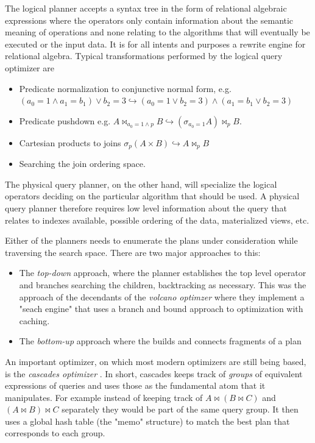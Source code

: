 The logical planner accepts a syntax tree in the form of relational
algebraic expressions where the operators only contain information
about the semantic meaning of operations and none relating to the
algorithms that will eventually be executed or the input data. It is
for all intents and purposes a rewrite engine for relational
algebra. Typical transformations performed by the logical query
optimizer are

\begin{itemize}
\item Predicate normalization to conjunctive normal form, e.g. \((a_0 = 1
  \land a_1 = b_1) \lor b_2 = 3 \hookrightarrow (a_0 = 1 \lor b_2 = 3)
  \land (a_1 = b_1 \lor b_2 = 3)\)
\item Predicate pushdown e.g. \(A \Join_{a_0 = 1 \land p} B
  \hookrightarrow (\sigma_{a_0 = 1} A) \Join_p B\).
\item Cartesian products to joins \(\sigma_p ( A \times B )
  \hookrightarrow A \Join_p B\)
\item Searching the join ordering space.
\end{itemize}

The physical query planner, on the other hand, will specialize the
logical operators deciding on the particular algorithm that should be
used. A physical query planner therefore requires low level
information about the query that relates to indexes available,
possible ordering of the data, materialized views, etc.

Either of the planners needs to enumerate the plans under
consideration while traversing the search space. There are two major
approaches to this:

\begin{itemize}
\item The \emph{top-down} approach, where the planner establishes the
  top level operator and branches searching the children, backtracking
  as necessary. This was the approach of the decendants of the
  \emph{volcano optimzer} \cite{graefeVolcanoOptimizerGenerator1993a}
  where they implement a "seach engine" that uses a branch and bound
  approach to optimization with caching.
\item The \emph{bottom-up} approach where the builds and connects
  fragments of a plan
  \cite{raasveldtDuckdbEmbeddableAnalytical2019,kemperHyPerHybridOLTP2011}
\end{itemize}

An important optimizer, on which most modern optimizers are still
being based, is the \emph{cascades optimizer}
\cite{graefeCascadesFrameworkQuery1995}. In short, cascades keeps
track of \emph{groups} of equivalent expressions of queries and uses
those as the fundamental atom that it manipulates. For example instead
of keeping track of \(A \Join (B \Join C)\) and
\((A \Join B) \Join C\) separately they would be part of the same
query group. It then uses a global hash table (the "memo" structure)
to match the best plan that corresponds to each group.

